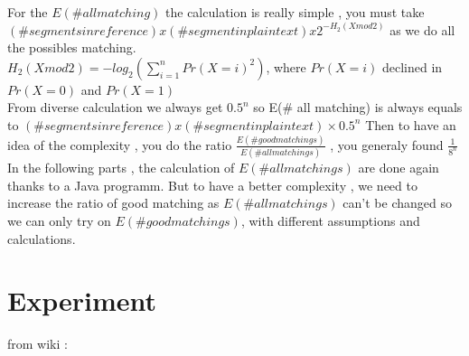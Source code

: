 \documentclass{article}
\begin{document}
${}$\hspace{1em}For the $E(\# all matching)$ the calculation is really simple , you must take $(\# segments in reference) x (\#segment in plaintext) x 2^{-H_{2}(X mod 2)}$ as we do all the possibles matching.\\
$H_{2}(X mod 2) = -log_2(\sum_{i=1}^{n}{Pr(X=i)^2})$, where $Pr(X=i)$ declined in $Pr(X=0)$ and $Pr(X=1)$\\
From diverse calculation we always get $0.5^n$ so E(\# all matching) is always equals to $(\# segments in reference) x (\#segment in plaintext) \times 0.5^n$
Then to have an idea of the complexity , you do the ratio $\frac{E(\# good matchings)}{E(\# all matchings)}$ , you generaly found $\frac{1}{8^n}$\\
In the following parts , the calculation of $E(\# all matchings)$ are done again thanks to a Java programm.
But to have a better complexity , we need to increase the ratio of good matching as $E(\# all matchings)$ can't be changed so we can only try on $E(\# good matchings)$, with different assumptions and calculations.\\

\section{Experiment}
from wiki :\\
\end{document}
